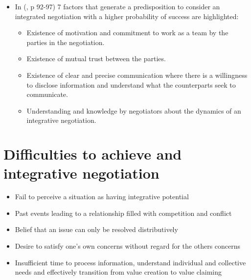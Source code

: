 \documentclass[
  ignorenonframetext,
]{beamer}
\providecommand{\tightlist}{%
  \setlength{\itemsep}{0pt}\setlength{\parskip}{0pt}}\usepackage{longtable,booktabs,array}
\begin{document}
\begin{frame}{}
\label{section-16}
\begin{itemize}
\item
  In (, p 92-97) 7 factors that generate a predisposition to
  consider an integrated negotiation with a higher probability of
  success are highlighted:

  \begin{itemize}
  \tightlist
  \item
    Existence of motivation and commitment to work as a team by the
    parties in the negotiation.
  \item
    Existence of mutual trust between the parties.
  \item
    Existence of clear and precise communication where there is a
    willingness to disclose information and understand what the
    counterparts seek to communicate.
  \item
    Understanding and knowledge by negotiators about the dynamics of an
    integrative negotiation.
  \end{itemize}
\end{itemize}
\end{frame}

\section{Difficulties to achieve and integrative
negotiation}\label{difficulties-to-achieve-and-integrative-negotiation}

\begin{frame}{}
\label{section-17}
\begin{itemize}
\tightlist
\item
  Fail to perceive a situation as having integrative potential
\item
  Past events leading to a relationship filled with competition and
  conflict
\item
  Belief that an issue can only be resolved distributively
\item
  Desire to satisfy one's own concerns without regard for the others
  concerns
\item
  Insufficient time to process information, understand individual and
  collective needs and effectively transition from value creation to
  value claiming
\end{itemize}
\end{frame}
\end{document}
